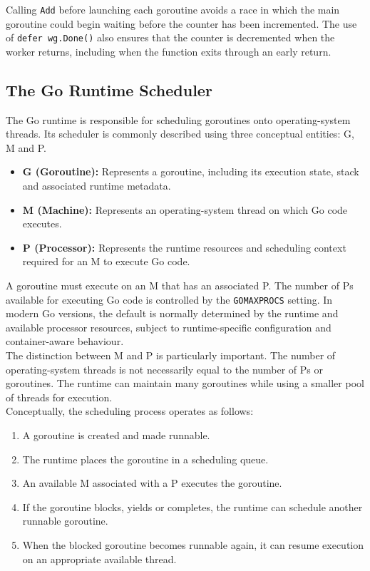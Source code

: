 Calling \texttt{Add} before launching each goroutine avoids a race in which the main goroutine could begin waiting before the counter has been incremented. The use of \texttt{defer wg.Done()} also ensures that the counter is decremented when the worker returns, including when the function exits through an early return.

\subsection{The Go Runtime Scheduler}

The Go runtime is responsible for scheduling goroutines onto operating-system threads. Its scheduler is commonly described using three conceptual entities: G, M and P.

\begin{itemize}
    \item \textbf{G (Goroutine):} Represents a goroutine, including its execution state, stack and associated runtime metadata.
    \item \textbf{M (Machine):} Represents an operating-system thread on which Go code executes.
    \item \textbf{P (Processor):} Represents the runtime resources and scheduling context required for an M to execute Go code.
\end{itemize}

A goroutine must execute on an M that has an associated P. The number of Ps available for executing Go code is controlled by the \texttt{GOMAXPROCS} setting. In modern Go versions, the default is normally determined by the runtime and available processor resources, subject to runtime-specific configuration and container-aware behaviour.\\

The distinction between M and P is particularly important. The number of operating-system threads is not necessarily equal to the number of Ps or goroutines. The runtime can maintain many goroutines while using a smaller pool of threads for execution.\\

Conceptually, the scheduling process operates as follows:

\begin{enumerate}
    \item A goroutine is created and made runnable.
    \item The runtime places the goroutine in a scheduling queue.
    \item An available M associated with a P executes the goroutine.
    \item If the goroutine blocks, yields or completes, the runtime can schedule another runnable goroutine.
    \item When the blocked goroutine becomes runnable again, it can resume execution on an appropriate available thread.
\end{enumerate}

